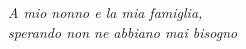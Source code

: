 \thispagestyle{empty}
\begin{flushright}
\vspace*{3.0cm}
{\large \textit{A mio nonno e la mia famiglia,}} \\ 
{\large \textit{sperando non ne abbiano mai bisogno}} \\ 
\end{flushright}